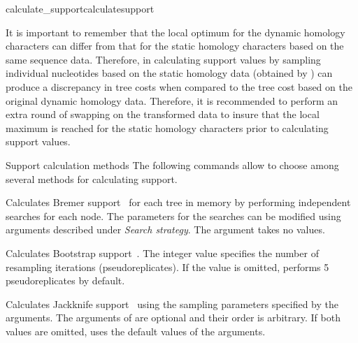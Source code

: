 \begin{command}{calculate\_support}{calculatesupport}
\begin{poydescription}
\begin{statement}
                
                It is important to remember that the local optimum for the dynamic
                homology characters can differ from that for the static homology characters
                based on the same sequence data. Therefore, in calculating support values by
                sampling individual nucleotides based on the static homology data (obtained by
                 ) can produce a discrepancy in tree costs when
                 compared to the tree cost based on the original dynamic homology data.
                 Therefore, it is recommended to perform an extra round of swapping on the
                 transformed data to insure that the local maximum is reached for the static
                 homology characters prior to calculating support values.
            \end{statement}
            
            \end{poydescription}

	\begin{arguments}
		\begin{argumentgroup}{Support calculation methods}
            {The following commands allow to choose among several methods for
            calculating support.} 

                {Calculates Bremer support~\cite{Bremer1988, Kallersjoetal1992}
                for each tree in memory by performing independent searches for each
                node. The parameters for the searches can be modified using arguments
                described under \emph{Search strategy}.
                The argument  takes no values.} 
                {}

                {Calculates Bootstrap support~\cite{Felsenstein1985}. 
                The integer value specifies
                the number of resampling iterations (pseudoreplicates). If the value
                is omitted, \poy performs 5 pseudoreplicates by default.} 
                {}

                {Calculates Jackknife support~\cite{Farrisetal1996} using the 
                sampling parameters specified by the arguments. The arguments of
                 are optional and their order is arbitrary. If
                both values are omitted, \poy uses the default values of the arguments.}
                {}
                

\end{argumentgroup}
\end{arguments}
\end{command}
